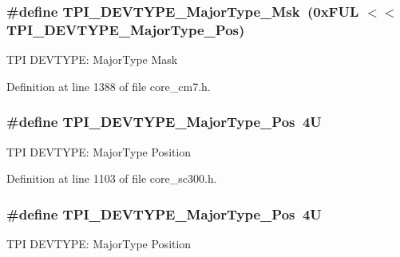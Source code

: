 \subsubsection[{\texorpdfstring{T\+P\+I\+\_\+\+D\+E\+V\+T\+Y\+P\+E\+\_\+\+Major\+Type\+\_\+\+Msk}{TPI_DEVTYPE_MajorType_Msk}}]{\setlength{\rightskip}{0pt plus 5cm}\#define T\+P\+I\+\_\+\+D\+E\+V\+T\+Y\+P\+E\+\_\+\+Major\+Type\+\_\+\+Msk~(0x\+F\+U\+L $<$$<$ T\+P\+I\+\_\+\+D\+E\+V\+T\+Y\+P\+E\+\_\+\+Major\+Type\+\_\+\+Pos)}\hypertarget{group___c_m_s_i_s___t_p_i_gaecbceed6d08ec586403b37ad47b38c88}{}\label{group___c_m_s_i_s___t_p_i_gaecbceed6d08ec586403b37ad47b38c88}
T\+PI D\+E\+V\+T\+Y\+PE\+: Major\+Type Mask 

Definition at line 1388 of file core\+\_\+cm7.\+h.

\subsubsection[{\texorpdfstring{T\+P\+I\+\_\+\+D\+E\+V\+T\+Y\+P\+E\+\_\+\+Major\+Type\+\_\+\+Pos}{TPI_DEVTYPE_MajorType_Pos}}]{\setlength{\rightskip}{0pt plus 5cm}\#define T\+P\+I\+\_\+\+D\+E\+V\+T\+Y\+P\+E\+\_\+\+Major\+Type\+\_\+\+Pos~4U}\hypertarget{group___c_m_s_i_s___t_p_i_ga69c4892d332755a9f64c1680497cebdd}{}\label{group___c_m_s_i_s___t_p_i_ga69c4892d332755a9f64c1680497cebdd}
T\+PI D\+E\+V\+T\+Y\+PE\+: Major\+Type Position 

Definition at line 1103 of file core\+\_\+sc300.\+h.

\subsubsection[{\texorpdfstring{T\+P\+I\+\_\+\+D\+E\+V\+T\+Y\+P\+E\+\_\+\+Major\+Type\+\_\+\+Pos}{TPI_DEVTYPE_MajorType_Pos}}]{\setlength{\rightskip}{0pt plus 5cm}\#define T\+P\+I\+\_\+\+D\+E\+V\+T\+Y\+P\+E\+\_\+\+Major\+Type\+\_\+\+Pos~4U}\hypertarget{group___c_m_s_i_s___t_p_i_ga69c4892d332755a9f64c1680497cebdd}{}\label{group___c_m_s_i_s___t_p_i_ga69c4892d332755a9f64c1680497cebdd}
T\+PI D\+E\+V\+T\+Y\+PE\+: Major\+Type Position 


